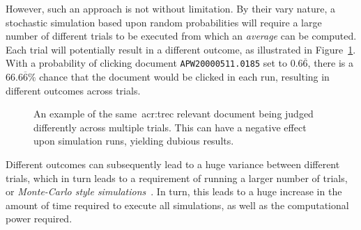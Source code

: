 However, such an approach is not without limitation. By their vary nature, a stochastic simulation based upon random probabilities will require a large number of different trials to be executed from which an \emph{average} can be computed. Each trial will potentially result in a different outcome, as illustrated in Figure~\ref{fig:multiple_runs}. With a probability of clicking document \texttt{APW20000511.0185} set to $0.6\overline{6}$, there is a $66.6\overline{6}\%$ chance that the document would be clicked in each run, resulting in different outcomes across trials.

\begin{figure}[t!]
    \centering
    \vspace{4mm}
    \caption[Stochastic judging across multiple trials]{An example of the same~\gls{acr:trec} relevant document being judged differently across multiple trials. This can have a negative effect upon simulation runs, yielding dubious results.}
    \label{fig:multiple_runs}
\end{figure}

Different outcomes can subsequently lead to a huge variance between different trials, which in turn leads to a requirement of running a larger number of trials, or \emph{Monte-Carlo style simulations}~\citep{benov2016manhattan}. In turn, this leads to a huge increase in the amount of time required to execute all simulations, as well as the computational power required.

